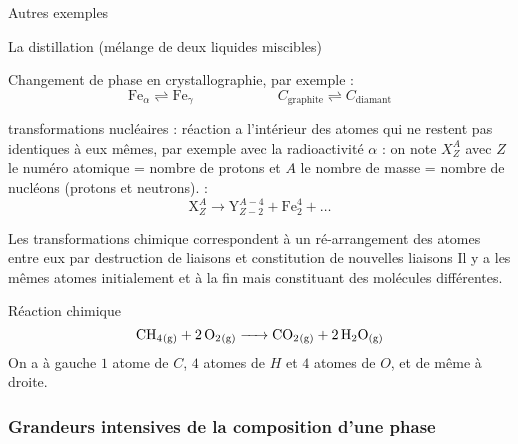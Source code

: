 \documentclass[a4paper,french,bookmarks]{book}
\begin{document}
    \begin{example}{Autres exemples}{}
        \begin{enumerate}
            \itt La distillation (mélange de deux liquides miscibles)
            
            \itt Changement de phase en crystallographie, par exemple :
            \[ \mathrm{Fe}_\alpha \rightleftharpoons \mathrm{Fe}_\gamma \qquad\qquad\qquad C_\text{graphite} \rightleftharpoons C_\text{diamant} \]
            
            \itt transformations nucléaires  : réaction a l'intérieur des atomes qui ne restent pas identiques à eux mêmes, par exemple avec la radioactivité $\alpha$ : \quad on note $X_Z^A$ avec $Z$ le numéro atomique = nombre de protons et $A$ le nombre de masse = nombre de nucléons (protons et neutrons). :
            \[ \mathrm X_Z^A \longrightarrow \mathrm Y_{Z-2}^{A-4} + \mathrm{Fe}_2^4 + \dots\]
        \end{enumerate}
    \end{example}
    
    Les transformations chimique correspondent à un ré-arrangement des atomes entre eux par destruction de liaisons et constitution de nouvelles liaisons Il y a les mêmes atomes initialement et à la fin mais constituant des molécules différentes.

    \begin{example}{Réaction chimique}{}
        \[ \ce{CH4_{(g)} + 2O2_{(g)} -> CO2_{(g)} + 2H2O_{(g)}} \]
        On a à gauche $1$ atome de $C$, $4$ atomes de $H$ et $4$ atomes de $O$, et de même à droite.
    \end{example}
    
    \subsubsection{Grandeurs intensives de la composition d'une phase}
    
\end{document}
